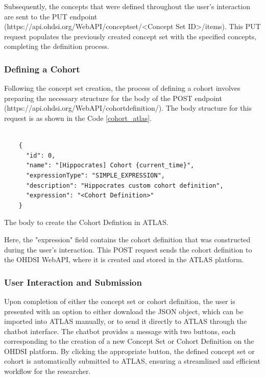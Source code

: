 Subsequently, the concepts that were defined throughout the user's interaction are sent to the PUT endpoint (https://api.ohdsi.org/WebAPI/conceptset/<Concept Set ID>/items). This PUT request populates the previously created concept set with the specified concepts, completing the definition process.

\subsubsection{Defining a Cohort}

Following the concept set creation, the process of defining a cohort involves preparing the necessary structure for the body of the POST endpoint (https://api.ohdsi.org/WebAPI/cohortdefinition/). The body structure for this request is as shown in the Code \ref{cohort_atlas}.


\begin{listing}[H]
  \begin{verbatim}
      
    {
      "id": 0,
      "name": "[Hippocrates] Cohort {current_time}",
      "expressionType": "SIMPLE_EXPRESSION",
      "description": "Hippocrates custom cohort definition",
      "expression": "<Cohort Definition>"
    }

  \end{verbatim}
  \caption{The body to create the Cohort Defintion in ATLAS.}
  \label{cohort_atlas}
\end{listing}


Here, the "expression" field contains the cohort definition that was constructed during the user's interaction. This POST request sends the cohort definition to the OHDSI WebAPI, where it is created and stored in the ATLAS platform.

\subsubsection{User Interaction and Submission}

Upon completion of either the concept set or cohort definition, the user is presented with an option to either download the JSON object, which can be imported into ATLAS manually, or to send it directly to ATLAS through the chatbot interface. The chatbot provides a message with two buttons, each corresponding to the creation of a new Concept Set or Cohort Definition on the OHDSI platform. By clicking the appropriate button, the defined concept set or cohort is automatically submitted to ATLAS, ensuring a streamlined and efficient workflow for the researcher.



